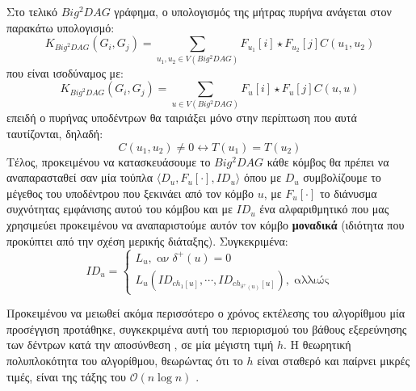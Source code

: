 Στο τελικό $Big^{2}DAG$ γράφημα, ο υπολογισμός της μήτρας πυρήνα ανάγεται στον παρακάτω υπολογισμό:
\begin{equation}
K_{Big^{2}DAG}(G_{i}, G_{j}) = \sum_{u_{1}, u_{2} \in V(Big^{2}DAG)} F_{u_{1}}[i] \star F_{u_{2}}[j] C(u_{1}, u_{2})
\end{equation}
που είναι ισοδύναμος με:
\begin{equation}
K_{Big^{2}DAG}(G_{i}, G_{j}) = \sum_{u \in V(Big^{2}DAG)} F_{u}[i] \star F_{u}[j] C(u, u)
\end{equation}
επειδή ο πυρήνας υποδέντρων θα ταιριάξει μόνο στην περίπτωση που αυτά ταυτίζονται, δηλαδή:
\begin{equation}
C(u_{1}, u_{2}) \not= 0 \leftrightarrow T(u_{1}) = T(u_{2})
\end{equation}
Τέλος, προκειμένου να κατασκευάσουμε το $Big^{2}DAG$ κάθε κόμβος θα πρέπει να αναπαρασταθεί σαν μία τούπλα $\langle D_{u} , F_{u}[\cdot], ID_{u} \rangle$ όπου με $D_{u}$ συμβολίζουμε το μέγεθος του υποδέντρου που ξεκινάει από τον κόμβο $u$, με $F_{u}[\cdot]$ το διάνυσμα συχνότητας εμφάνισης αυτού του κόμβου και με $ID_{u}$ ένα αλφαριθμητικό που μας χρησιμεύει προκειμένου να αναπαριστούμε αυτόν τον κόμβο \textbf{μοναδικά} (ιδιότητα που προκύπτει από την σχέση μερικής διάταξης).
Συγκεκριμένα:
\begin{equation}
ID_{u} = \begin{cases}
            L_{u},\;\text{αν}\;\delta^{+}(u)=0\\
            L_{u}(ID_{ch_{1}[u]}, \cdots, ID_{ch_{\delta^{+}(u)}[u]}),\;\text{αλλιώς}
        \end{cases}
\end{equation}

Προκειμένου να μειωθεί ακόμα περισσότερο ο χρόνος εκτέλεσης του αλγορίθμου μία προσέγγιση προτάθηκε, συγκεκριμένα αυτή του περιορισμού του βάθους εξερεύνησης των δέντρων  κατά την αποσύνθεση , σε μία μέγιστη τιμή $h$.
Η θεωρητική πολυπλοκότητα του αλγορίθμου, θεωρώντας ότι το $h$ είναι σταθερό και παίρνει μικρές τιμές, είναι της τάξης του $\mathcal{O}(n\log n)$ \cite[]{Martino2012ATK}.

